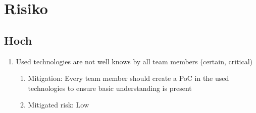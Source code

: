 \chapter{Risiko}

\section{Hoch}
\begin{enumerate}
    \item Used technologies are not well knows by all team members (certain, critical) 
    \begin{enumerate}
        \item Mitigation: Every team member should create a PoC in the used technologies to ensure basic understanding is present
        \item Mitigated risk: Low
    \end{enumerate}
\end{enumerate}

